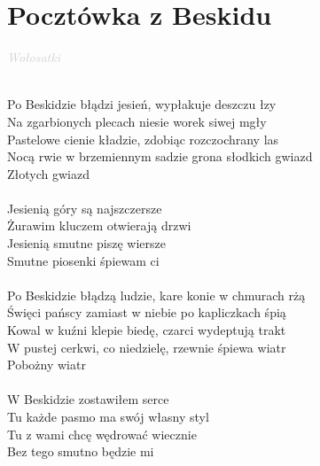 \documentclass[a5paper, 10pt]{book}
\begin{document}



\newpage
\section{Pocztówka z Beskidu}\textcolor{lightgray}{\textit{Wołosatki}}\\~\\
\begin{minipage}[t]{0.8\textwidth}
  Po Beskidzie błądzi jesień, wypłakuje deszczu łzy\\
  Na zgarbionych plecach niesie worek siwej mgły\\
  Pastelowe cienie kładzie, zdobiąc rozczochrany las\\
  Nocą rwie w brzemiennym sadzie grona słodkich gwiazd\\
  Złotych gwiazd\\
  \\
  \hspace*{5mm}Jesienią góry są najszczersze\\
  \hspace*{5mm}Żurawim kluczem otwierają drzwi\\
  \hspace*{5mm}Jesienią smutne piszę wiersze\\
  \hspace*{5mm}Smutne piosenki śpiewam ci\\
  \\
  Po Beskidzie błądzą ludzie, kare konie w chmurach rżą\\
  Święci pańscy zamiast w niebie po kapliczkach śpią\\
  Kowal w kuźni klepie biedę, czarci wydeptują trakt\\
  W pustej cerkwi, co niedzielę, rzewnie śpiewa wiatr\\
  Pobożny wiatr\\
  \\
  \hspace*{5mm}W Beskidzie zostawiłem serce\\
  \hspace*{5mm}Tu każde pasmo ma swój własny styl\\
  \hspace*{5mm}Tu z wami chcę wędrować wiecznie\\
  \hspace*{5mm}Bez tego smutno będzie mi\\
\end{minipage}
\end{document}
